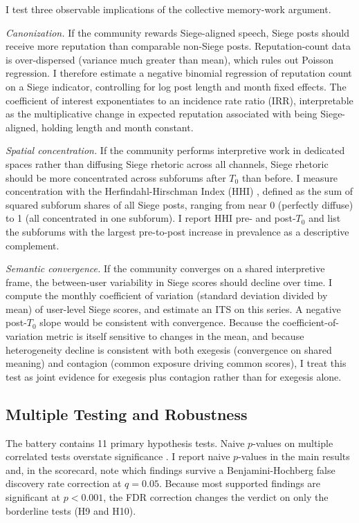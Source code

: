 \documentclass[bibtex,autowc,nonblind]{apsr_submission}
\begin{document}
I test three observable implications of the collective memory-work argument.

\textit{Canonization.} If the community rewards Siege-aligned speech, Siege posts should receive more reputation than comparable non-Siege posts. Reputation-count data is over-dispersed (variance much greater than mean), which rules out Poisson regression. I therefore estimate a negative binomial regression \citep{hilbe2011negative} of reputation count on a Siege indicator, controlling for log post length and month fixed effects. The coefficient of interest exponentiates to an incidence rate ratio (IRR), interpretable as the multiplicative change in expected reputation associated with being Siege-aligned, holding length and month constant.

\textit{Spatial concentration.} If the community performs interpretive work in dedicated spaces rather than diffusing Siege rhetoric across all channels, Siege rhetoric should be more concentrated across subforums after $T_0$ than before. I measure concentration with the Herfindahl-Hirschman Index (HHI) \citep{hirschman1964concentration}, defined as the sum of squared subforum shares of all Siege posts, ranging from near 0 (perfectly diffuse) to 1 (all concentrated in one subforum). I report HHI pre- and post-$T_0$ and list the subforums with the largest pre-to-post increase in prevalence as a descriptive complement.

\textit{Semantic convergence.} If the community converges on a shared interpretive frame, the between-user variability in Siege scores should decline over time. I compute the monthly coefficient of variation (standard deviation divided by mean) of user-level Siege scores, and estimate an ITS on this series. A negative post-$T_0$ slope would be consistent with convergence. Because the coefficient-of-variation metric is itself sensitive to changes in the mean, and because heterogeneity decline is consistent with both exegesis (convergence on shared meaning) and contagion (common exposure driving common scores), I treat this test as joint evidence for exegesis plus contagion rather than for exegesis alone.

\subsection{Multiple Testing and Robustness}

The battery contains 11 primary hypothesis tests. Naive $p$-values on multiple correlated tests overstate significance \citep{benjamini1995controlling}. I report naive $p$-values in the main results and, in the scorecard, note which findings survive a Benjamini-Hochberg false discovery rate correction at $q = 0.05$. Because most supported findings are significant at $p < 0.001$, the FDR correction changes the verdict on only the borderline tests (H9 and H10).
\end{document}
